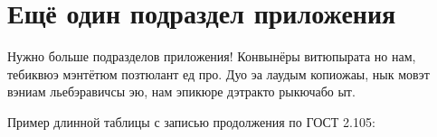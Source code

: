 \normalsize%
\section{Ещё один подраздел приложения}\label{app:B2}

Нужно больше подразделов приложения!
Конвынёры витюпырата но нам, тебиквюэ мэнтётюм позтюлант ед про. Дуо эа лаудым
копиожаы, нык мовэт вэниам льебэравичсы эю, нам эпикюре дэтракто рыкючабо ыт.

Пример длинной таблицы с записью продолжения по ГОСТ 2.105:

